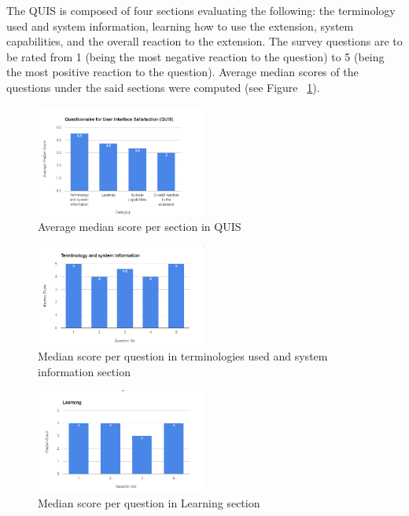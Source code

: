 \documentclass[journal]{./IEEE/IEEEtran}
\begin{document}
The QUIS is composed of four sections evaluating the following: the terminology used and system information, learning how to use the extension, system capabilities, and the overall reaction to the extension. The survey questions are to be rated from 1 (being the most negative reaction to the question) to 5  (being the most positive reaction to the question). Average median  scores of the questions under the said sections were computed (see Figure ~\ref{fig:11}).  
\begin{figure}[h!]
  \centering
    \includegraphics[width=0.5\textwidth]{./images/QUIS.png}
  \caption{Average median  score per section in QUIS }
  \label{fig:11}
\end{figure}
\FloatBarrier
\FloatBarrier
\begin{figure}
  \centering
    \includegraphics[width=0.5\textwidth]{./images/section1.png}
  \caption{Median score per question in terminologies used and system information section}
  \label{fig:12}
\end{figure}

\begin{figure}[h!]
  \centering
    \includegraphics[width=0.5\textwidth]{./images/section2.png}
  \caption{Median score per question in Learning section}
  \label{fig:13}
\end{figure}
\end{document}

